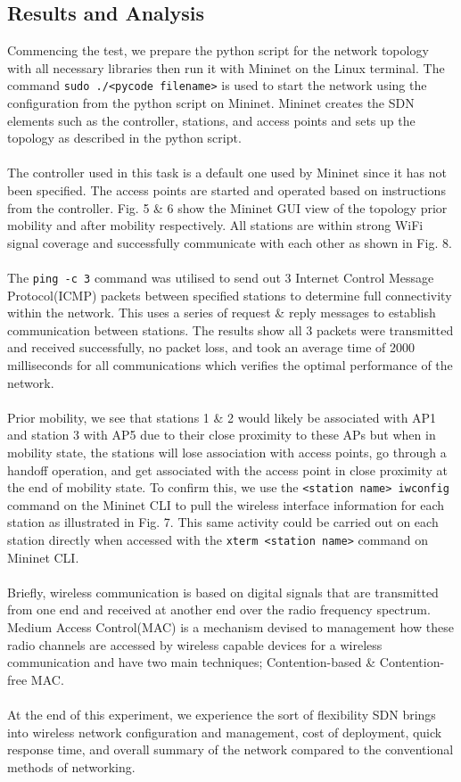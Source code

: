 \documentclass{article}
\begin{document}
\subsection{Results and Analysis}
Commencing the test, we prepare the python script for the network topology with all necessary libraries then run it with Mininet on the Linux terminal. The command \texttt{sudo ./<pycode filename>} is used to start the network using the configuration from the python script on Mininet. Mininet creates the SDN elements such as the controller, stations, and access points and sets up the topology as described in the python script. \\\\ The controller used in this task is a default one used by Mininet since it has not been specified. The access points are started and operated based on instructions from the controller. Fig. 5 \& 6 show the Mininet GUI view of the topology prior mobility and after mobility respectively. All stations are within strong WiFi signal coverage and successfully communicate with each other as shown in Fig. 8. \\\\ The \texttt{ping -c 3} command was utilised to send out 3 Internet Control Message Protocol(ICMP)\cite{1010101} packets between specified stations to determine full connectivity within the network. This uses a series of request \& reply messages to establish communication between stations. The results show all 3 packets were transmitted and received successfully, no packet loss, and took an average time of 2000 milliseconds for all communications which verifies the optimal performance of the network. \\\\ Prior mobility, we see that stations 1 \& 2 would likely be associated with AP1 and station 3 with AP5 due to their close proximity to these APs but when in mobility state, the stations will lose association with access points, go through a handoff operation, and get associated with the access point in close proximity at the end of mobility state. To confirm this, we use the \texttt{<station name> iwconfig} command on the Mininet CLI to pull the wireless interface information for each station as illustrated in Fig. 7. This same activity could be carried out on each station directly when accessed with the \texttt{xterm <station name>} command on Mininet CLI. \\\\ Briefly, wireless communication is based on digital signals that are transmitted from one end and received at another end over the radio frequency spectrum. Medium Access Control(MAC)\cite{1010101} is a mechanism devised to management how these radio channels are accessed by wireless capable devices for a wireless communication and have two main techniques; Contention-based \& Contention-free MAC. \\\\ At the end of this experiment, we experience the sort of flexibility SDN brings into wireless network configuration and management, cost of deployment,  quick response time, and overall summary of the network compared to the conventional methods of networking.
\end{document}

